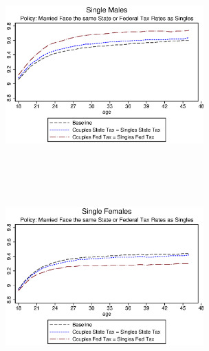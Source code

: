 \documentclass[14pt,thmsa]{article}
\begin{document}
\begin{figure}[h]
\begin{minipage}[l]{0.5\textwidth}
    \centering
  \includegraphics[width=3in,height=3in]{policy3.eps}
\end{minipage}
\begin{minipage}[l]{0.5\textwidth}
    \centering
  \includegraphics[width=3in,height=3in]{policy4.eps}
\end{minipage}
\end{figure}
\end{document}
